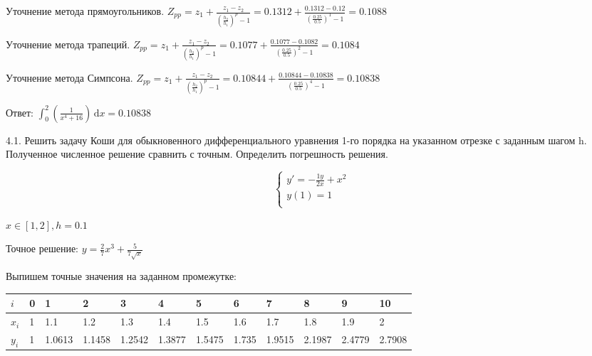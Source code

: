 \documentclass[10pt, a4paper]{scrartcl}
\begin{document}
\vspace{5mm}

Уточнение метода прямоугольников.
\(\displaystyle Z_{pp} = z_1 + \frac{z_1 - z_2}{(\frac{h_2}{h_1})^p - 1} = 0.1312 + \frac{0.1312 - 0.12}{(\frac{0.25}{0.5})^1 - 1} = 0.1088\)

Уточнение метода трапеций.
\(\displaystyle Z_{pp} = z_1 + \frac{z_1 - z_2}{(\frac{h_2}{h_1})^p - 1} = 0.1077 + \frac{0.1077 - 0.1082}{(\frac{0.25}{0.5})^2 - 1} = 0.1084\)

Уточнение метода Симпсона.
\(\displaystyle Z_{pp} = z_1 + \frac{z_1 - z_2}{(\frac{h_2}{h_1})^p - 1} = 0.10844 + \frac{0.10844 - 0.10838}{(\frac{0.25}{0.5})^4 - 1} = 0.10838\)

\vspace{5mm}

Ответ:
\(\displaystyle\int_{0}^{2} \left( \frac{1}{x^4 + 16}\right) \,\mathrm{d}x = 0.10838\)

\pagebreak

4.1. Решить задачу Коши для обыкновенного дифференциального уравнения
1-го порядка на указанном отрезке с заданным шагом h. Полученное
численное решение сравнить с точным. Определить погрешность решения.

\[\begin{cases}
y' = - \frac{1y}{2x} + x^2\\
y(1) = 1\\
\end{cases}\]

\(\displaystyle x \in [1, 2], h = 0.1\)

Точное решение:
\(\displaystyle y = \frac{2}{7}x^3 + \frac{5}{7\sqrt{x}}\)

\vspace{5mm}

Выпишем точные значения на заданном промежутке:

\begin{center}
\begin{tabular}{ | l  | l  | l  | l  | l  | l  | l  | l  | l  | l  | l  | l |}
\hline
$i$ & 0 & 1 & 2 & 3 & 4 & 5 & 6 & 7 & 8 & 9 & 10 \\ \hline
$x_i$ & 1 & 1.1 & 1.2 & 1.3 & 1.4 & 1.5 & 1.6 & 1.7 & 1.8 & 1.9 & 2 \\ \hline
$y_i$ & 1 & 1.0613 & 1.1458 & 1.2542 & 1.3877 & 1.5475 & 1.735 & 1.9515 & 2.1987 & 2.4779 & 2.7908 \\ \hline
\end{tabular}
\end{center}
\end{document}
